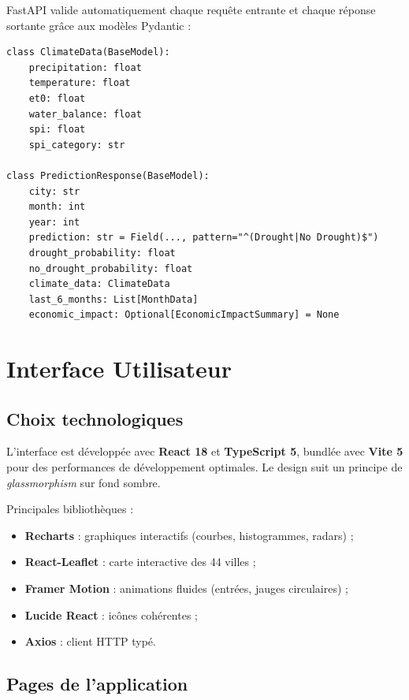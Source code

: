 \documentclass[12pt,a4paper]{report}
\begin{document}
FastAPI valide automatiquement chaque requête entrante et chaque réponse sortante grâce aux modèles Pydantic :

\begin{lstlisting}[style=pythonStyle, caption={Extraits des modèles Pydantic (main.py)}]
class ClimateData(BaseModel):
    precipitation: float
    temperature: float
    et0: float
    water_balance: float
    spi: float
    spi_category: str

class PredictionResponse(BaseModel):
    city: str
    month: int
    year: int
    prediction: str = Field(..., pattern="^(Drought|No Drought)$")
    drought_probability: float
    no_drought_probability: float
    climate_data: ClimateData
    last_6_months: List[MonthData]
    economic_impact: Optional[EconomicImpactSummary] = None
\end{lstlisting}

\chapter{Interface Utilisateur}

\section{Choix technologiques}

L'interface est développée avec \textbf{React 18} et \textbf{TypeScript 5}, bundlée avec \textbf{Vite 5} pour des performances de développement optimales. Le design suit un principe de \textit{glassmorphism} sur fond sombre.

Principales bibliothèques :
\begin{itemize}
    \item \textbf{Recharts} : graphiques interactifs (courbes, histogrammes, radars) ;
    \item \textbf{React-Leaflet} : carte interactive des 44 villes ;
    \item \textbf{Framer Motion} : animations fluides (entrées, jauges circulaires) ;
    \item \textbf{Lucide React} : icônes cohérentes ;
    \item \textbf{Axios} : client HTTP typé.
\end{itemize}

\section{Pages de l'application}
\end{document}
